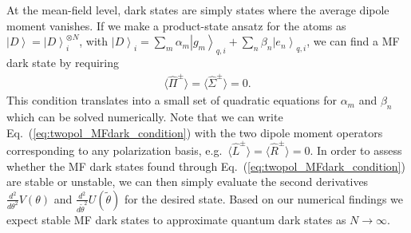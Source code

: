 \documentclass[aps,prx,superscriptaddress,twocolumn,notitlepage,nofootinbib,longbibliography]{revtex4-2}
\newcommand{\ket}[1]{\left|#1\right>}
\newcommand{\qusub}{q}
\begin{document}
At the mean-field level, dark states are simply states where the average dipole moment vanishes.
If we make a product-state ansatz for the atoms as $\ket{D} = \ket{D}_i^{\otimes N}$, with $\ket{D}_i = \sum_{m} \alpha_m \ket{g_m}_{\qusub,i} + \sum_{n} \beta_n \ket{e_n}_{\qusub,i}$, we can find a MF dark state by requiring
\begin{align}
	\langle \hat{\Pi}^\pm \rangle = \langle \hat{\Sigma}^\pm \rangle = 0.
\label{eq:twopol_MFdark_condition}
\end{align}
This condition translates into a small set of quadratic equations for $\alpha_m$ and $\beta_n$ which can be solved numerically. Note that we can write Eq.~(\ref{eq:twopol_MFdark_condition}) with the two dipole moment operators corresponding to any polarization basis, e.g.~$\langle \hat{L}^\pm \rangle = \langle \hat{R}^\pm \rangle = 0$.
In order to assess whether the MF dark states found through Eq.~(\ref{eq:twopol_MFdark_condition}) are stable or unstable, we can then simply evaluate the second derivatives $\frac{d^2}{d\theta^2}V(\theta)$ and $\frac{d^2}{d\tilde\theta^2}U(\tilde\theta)$ for the desired state.
Based on our numerical findings we expect stable MF dark states to approximate quantum dark states as $N\rightarrow\infty$.








\vfill



\end{document}

